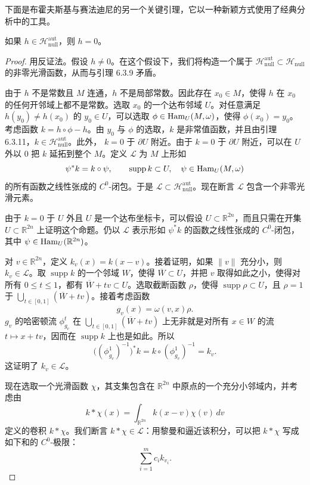 下面是布霍夫斯基与赛法迪尼的另一个关键引理，它以一种新颖方式使用了经典分析中的工具。

\begin{lemma}\label{lem:autonomous-null-hamiltonian-zero}
如果 $h\in\mathcal H_{\mathrm{null}}^{\mathrm{aut}}$，则 $h=0$。
\end{lemma}

\begin{proof}
用反证法。假设 $h\ne0$。在这个假设下，我们将构造一个属于
$\mathcal H_{\mathrm{null}}^{\mathrm{aut}}\subset
\mathcal H_{\mathrm{null}}$ 的非零光滑函数，从而与引理 6.3.9 矛盾。

由于 $h$ 不是常数且 $M$ 连通，$h$ 不是局部常数。因此存在
$x_0\in M$，使得 $h$ 在 $x_0$ 的任何开邻域上都不是常数。选取
$x_0$ 的一个达布邻域 $U$。对任意满足
$h(y_0)\ne h(x_0)$ 的 $y_0\in U$，可以选取
$\phi\in\operatorname{Ham}_U(M,\omega)$，使得 $\phi(x_0)=y_0$。考虑函数
$k=h\circ\phi-h$。由 $y_0$ 与 $\phi$ 的选取，$k$ 是非常值函数，并且由引理
6.3.11，$k\in\mathcal H_{\mathrm{null}}^{\mathrm{aut}}$。此外，
$k=0$ 于 $\partial U$ 附近。由于 $k=0$ 于 $\partial U$ 附近，可以在
$U$ 外以 $0$ 把 $k$ 延拓到整个 $M$。定义 $\mathcal L$ 为 $M$ 上形如
\[
 \psi^*k=k\circ\psi,
 \qquad \operatorname{supp}k\subset U,\quad
 \psi\in\operatorname{Ham}_U(M,\omega)
\]
的所有函数之线性张成的 $C^0$-闭包。于是
$\mathcal L\subset\mathcal H_{\mathrm{null}}^{\mathrm{aut}}$。现在断言
$\mathcal L$ 包含一个非零光滑元素。

由于 $k=0$ 于 $U$ 外且 $U$ 是一个达布坐标卡，可以假设
$U\subset\mathbb R^{2n}$，而且只需在开集
$U\subset\mathbb R^{2n}$ 上证明这个命题。仍以 $\mathcal L$ 表示形如
$\psi^*k$ 的函数之线性张成的 $C^0$-闭包，其中
$\psi\in\operatorname{Ham}_U(\mathbb R^{2n})$。

对 $v\in\mathbb R^{2n}$，定义
$k_v(x)=k(x-v)$。接着证明，如果 $\|v\|$ 充分小，则
$k_v\in\mathcal L$。取 $\operatorname{supp}k$ 的一个邻域
$W$，使得 $\overline W\subset U$，并把 $v$ 取得如此之小，使得对所有
$0\leq t\leq1$，都有 $\overline W+tv\subset U$。选取截断函数
$\rho$，使得 $\operatorname{supp}\rho\subset U$，且
$\rho=1$ 于
$\bigcup_{t\in[0,1]}(\overline W+tv)$。接着考虑函数
\[
 g_v(x)=\omega(v,x)\rho.
\]
$g_v$ 的哈密顿流 $\phi_{g_v}^t$ 在
$\bigcup_{t\in[0,1]}(\overline W+tv)$ 上无非就是对所有
$x\in W$ 的流 $t\mapsto x+tv$，因而在
$\operatorname{supp}k$ 上也是如此。所以
\[
 \bigl((\phi_{g_v}^1)^{-1}\bigr)^*k
 =k\circ(\phi_{g_v}^1)^{-1}=k_v.
\]
这证明了 $k_v\in\mathcal L$。

现在选取一个光滑函数 $\chi$，其支集包含在
$\mathbb R^{2n}$ 中原点的一个充分小邻域内，并考虑由
\[
 k*\chi(x)=\int_{\mathbb R^{2n}}k(x-v)\chi(v)\,dv
\]
定义的卷积 $k*\chi$。我们断言 $k*\chi\in\mathcal L$：用黎曼和逼近该积分，可以把
$k*\chi$ 写成如下和的 $C^0$-极限：
\[
 \sum_{i=1}^m c_i k_{v_i}.
\]


\end{proof}
